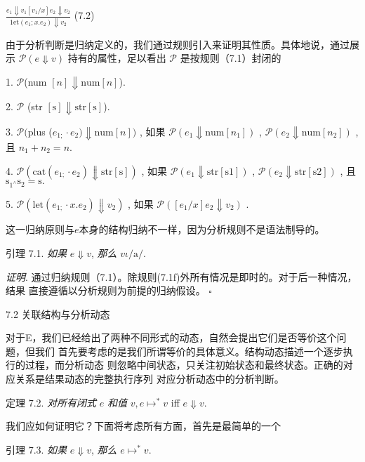\begin{center}
$\displaystyle \frac{e_{1}\Downarrow v_{1}[v_{1}/x]e_{2}\Downarrow v_{2}}{1\mathrm{e}\mathrm{t}(e_{1};x.e_{2})\Downarrow v_{2}}$   (7.2)
\end{center}
由于分析判断是归纳定义的，我们通过规则引入来证明其性质。具体地说，通过展示 $\mathcal{P}(e\Downarrow v)$ 持有的属性，足以看出 $\mathcal{P}$ 是按规则（7.1）封闭的

1. $\mathcal{P}$(num $[n]\Downarrow \mathrm{n}\mathrm{u}\mathrm{m}[n]$).

2. $\mathcal{P}$ (str $[\mathrm{s}]\Downarrow \mathrm{s}\mathrm{t}\mathrm{r}[\mathrm{s}]$).

3. $\mathcal{P}($plus ($e_{1;}\cdot e_{2})\Downarrow \mathrm{n}\mathrm{u}\mathrm{m}[n])$ , 如果 $\mathcal{P}(e_{1}\Downarrow \mathrm{n}\mathrm{u}\mathrm{m}[n_{1}])$ , $\mathcal{P}(e_{2}\Downarrow \mathrm{n}\mathrm{u}\mathrm{m}[n_{2}])$ , 且 $n_{1}+n_{2}=n.$

4. $\mathcal{P}(\mathrm{c}\mathrm{a}\mathrm{t}(e_{1;}\cdot e_{2})\Downarrow \mathrm{s}\mathrm{t}\mathrm{r}[\mathrm{s}])$ , 如果 $\mathcal{P}(e_{1}\Downarrow \mathrm{s}\mathrm{t}\mathrm{r}[\mathrm{s}1])$ , $\mathcal{P}(e_{2}\Downarrow \mathrm{s}\mathrm{t}\mathrm{r}[\mathrm{s}2])$ , 且 $\mathrm{s}_{1^{\wedge}}\mathrm{s}_{2}=\mathrm{s}.$

5. $\mathcal{P}(\mathrm{l}\mathrm{e}\mathrm{t}(e_{1;}\cdot x.e_{2})\Downarrow v_{2})$ , 如果 $\mathcal{P}([e_{1}/x]e_{2}\Downarrow v_{2})$ .

这一归纳原则与$e$本身的结构归纳不一样，因为分析规则不是语法制导的。

引理 7.1. {\it 如果} $e\Downarrow v$, {\it 那么} $v\iota/\mathrm{a}/.$

{\it 证明}. 通过归纳规则（7.1）。除规则(7.1f)外所有情况是即时的。对于后一种情况，结果
直接遵循以分析规则为前提的归纳假设。 $\square $

7.2 关联结构与分析动态

对于E，我们已经给出了两种不同形式的动态，自然会提出它们是否等价这个问题，但我们
首先要考虑的是我们所谓等价的具体意义。结构动态描述一个逐步执行的过程，而分析动态
则忽略中间状态，只关注初始状态和最终状态。正确的对应关系是结果动态的完整执行序列
对应分析动态中的分析判断。

定理 7.2. {\it 对所有闭式} $e$ {\it 和值} $v, e\mapsto^{*}v$ iff $e\Downarrow v.$

我们应如何证明它？下面将考虑所有方面，首先是最简单的一个

引理 7.3. {\it 如果} $e\Downarrow v$, {\it 那么} $e\mapsto^{*}v.$

